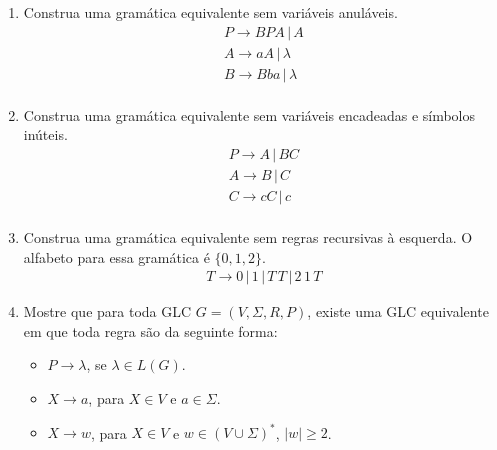 \documentclass[a4paper]{article}
\theoremstyle{definition}
\begin{document}
  \begin{enumerate}
     \item Construa uma gramática equivalente sem variáveis anuláveis.
       \[
         \begin{array}{l}
           P \to BPA \,|\,A \\
           A \to aA \,|\, \lambda\\
           B \to Bba \,|\,\lambda\\
         \end{array}
       \]
     \item Construa uma gramática equivalente sem variáveis encadeadas e
       símbolos inúteis.
       \[
         \begin{array}{l}
           P \to A \,|\,BC\\
           A \to B \,|\, C\\
           C \to cC \,|\, c\\
         \end{array}
       \]
     \item Construa uma gramática equivalente sem regras recursivas à esquerda.
       O alfabeto para essa gramática é $\{0,1,2\}$.
       \[
         \begin{array}{l}
           T \to 0\, |\, 1 \,|\, T\,T\,|\,2\,1\,T 
         \end{array}
       \]
     \item Mostre que para toda GLC $G = (V,\Sigma,R,P)$, existe uma GLC equivalente em que toda
       regra são da seguinte forma:
       \begin{itemize}
       \item $P \to \lambda$, se $\lambda \in L(G)$.
       \item $X \to a$, para $X \in V$ e $a\in\Sigma$.
       \item $X \to w$, para $X\in V$ e $w \in (V\cup\Sigma)^*$, $|w|\geq 2$.
       \end{itemize}
  \end{enumerate}
\end{document}
